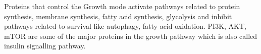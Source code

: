 Proteins that control the Growth mode activate pathways related to protein synthesis, membrane synthesis, fatty acid synthesis, glycolysis and inhibit pathways related to survival like autophagy, fatty acid oxidation.
PI3K, AKT, mTOR are some of the major proteins in the growth pathway which is also called insulin signalling pathway.  